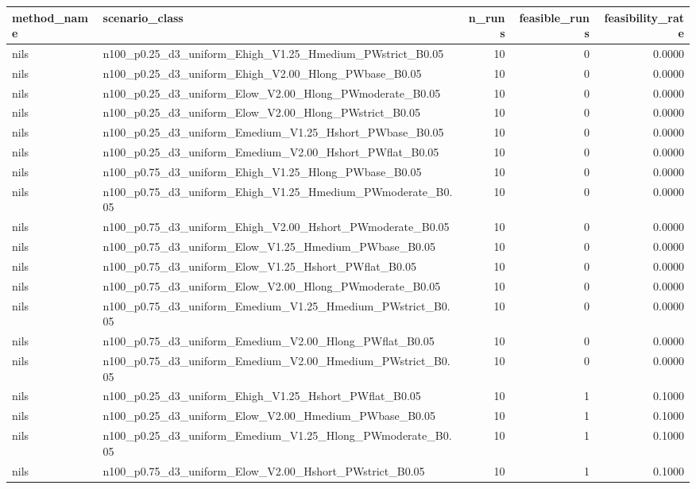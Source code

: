 \begin{tabular}{llrrr}
\toprule
method_name & scenario_class & n_runs & feasible_runs & feasibility_rate \\
\midrule
nils & n100_p0.25_d3_uniform_Ehigh_V1.25_Hmedium_PWstrict_B0.05 & 10 & 0 & 0.0000 \\
nils & n100_p0.25_d3_uniform_Ehigh_V2.00_Hlong_PWbase_B0.05 & 10 & 0 & 0.0000 \\
nils & n100_p0.25_d3_uniform_Elow_V2.00_Hlong_PWmoderate_B0.05 & 10 & 0 & 0.0000 \\
nils & n100_p0.25_d3_uniform_Elow_V2.00_Hlong_PWstrict_B0.05 & 10 & 0 & 0.0000 \\
nils & n100_p0.25_d3_uniform_Emedium_V1.25_Hshort_PWbase_B0.05 & 10 & 0 & 0.0000 \\
nils & n100_p0.25_d3_uniform_Emedium_V2.00_Hshort_PWflat_B0.05 & 10 & 0 & 0.0000 \\
nils & n100_p0.75_d3_uniform_Ehigh_V1.25_Hlong_PWbase_B0.05 & 10 & 0 & 0.0000 \\
nils & n100_p0.75_d3_uniform_Ehigh_V1.25_Hmedium_PWmoderate_B0.05 & 10 & 0 & 0.0000 \\
nils & n100_p0.75_d3_uniform_Ehigh_V2.00_Hshort_PWmoderate_B0.05 & 10 & 0 & 0.0000 \\
nils & n100_p0.75_d3_uniform_Elow_V1.25_Hmedium_PWbase_B0.05 & 10 & 0 & 0.0000 \\
nils & n100_p0.75_d3_uniform_Elow_V1.25_Hshort_PWflat_B0.05 & 10 & 0 & 0.0000 \\
nils & n100_p0.75_d3_uniform_Elow_V2.00_Hlong_PWmoderate_B0.05 & 10 & 0 & 0.0000 \\
nils & n100_p0.75_d3_uniform_Emedium_V1.25_Hmedium_PWstrict_B0.05 & 10 & 0 & 0.0000 \\
nils & n100_p0.75_d3_uniform_Emedium_V2.00_Hlong_PWflat_B0.05 & 10 & 0 & 0.0000 \\
nils & n100_p0.75_d3_uniform_Emedium_V2.00_Hmedium_PWstrict_B0.05 & 10 & 0 & 0.0000 \\
nils & n100_p0.25_d3_uniform_Ehigh_V1.25_Hshort_PWflat_B0.05 & 10 & 1 & 0.1000 \\
nils & n100_p0.25_d3_uniform_Elow_V2.00_Hmedium_PWbase_B0.05 & 10 & 1 & 0.1000 \\
nils & n100_p0.25_d3_uniform_Emedium_V1.25_Hlong_PWmoderate_B0.05 & 10 & 1 & 0.1000 \\
nils & n100_p0.75_d3_uniform_Elow_V2.00_Hshort_PWstrict_B0.05 & 10 & 1 & 0.1000 \\

\end{tabular}
